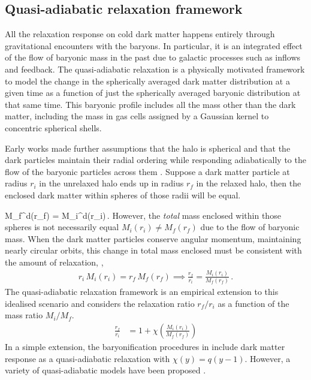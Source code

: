 \subsection{Quasi-adiabatic relaxation framework}
\label{sec:methods-adiab}
All the relaxation response on cold dark matter happens entirely through gravitational encounters with the baryons. In particular, it is an integrated effect of the flow of baryonic mass in the past due to galactic processes such as inflows and feedback. The quasi-adiabatic relaxation is a physically motivated framework to model the change in the spherically averaged dark matter distribution at a given time as a function of just the spherically averaged baryonic distribution at that same time. This baryonic profile includes all the mass other than the dark matter, including the mass in gas cells assigned by a Gaussian kernel to concentric spherical shells. 

Early works made further assumptions that the halo is spherical and that the dark particles maintain their radial ordering while responding adiabatically to the flow of the baryonic particles across them \citep[][]{1986ApJ...301...27B}. Suppose a dark matter particle at radius $r_i$ in the unrelaxed
halo ends up in radius $r_f$ in the relaxed halo, then the enclosed dark matter within spheres of those radii will be equal.

\be 
M_f^d(r_f) = M_i^d(r_i)\,.
\label{eq:DMmass}
\ee
However, the \emph{total} mass enclosed within those spheres is not necessarily equal $M_i(r_i) \neq M_f(r_f)$ due to the flow of baryonic mass. When the dark matter particles conserve angular momentum, maintaining nearly circular orbits, this change in total mass enclosed must be consistent with the amount of relaxation,
\citep[][]{1986ApJ...301...27B},
\begin{align}
    r_i \,M_i(r_i) = r_f \,M_f(r_f) %
    \implies 
\frac{r_f}{r_i} = \frac{M_i(r_i)}{M_f(r_f)}\,. 
\label{eq:AR}
\end{align}
The quasi-adiabatic relaxation framework is an empirical extension to this idealised scenario and considers the relaxation ratio $r_f/r_i$ as a function of the mass ratio $M_i/M_f$.
\begin{align}
\frac{r_f}{r_i} &= 1 + \chi \left( \frac{M_i(r_i)}{M_f(r_f)} \right) 
\label{eq:qAR}
\end{align}
In a simple extension, the baryonification procedures in \cite{2015JCAP...12..049S,2021MNRAS.503.4147P} include dark matter response as a quasi-adiabatic relaxation with $\chi(y) = q (y-1)$. However, a variety of quasi-adiabatic models have been proposed \citep{2023Velmani&Paranjape}.  

